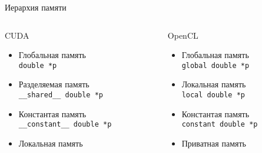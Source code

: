 \documentclass[@BEAMER_OPTIONS@]{beamer}
\newcommand{\code}[1]{\lstinline|#1|}
\begin{document}
\begin{frame}
    \sectionpage
\end{frame}

\begin{frame}[fragile]{Иерархия памяти}
    \begin{columns}
        \begin{column}{0.48\textwidth}
            \begin{block}{CUDA}
                \begin{itemize}
                    \item<2-> Глобальная память\\
                        \code{double *p}
                    \item<3-> Разделяемая память\\
                        \code{__shared__ double *p}
                    \item<4-> Константая память\\
                        \code{__constant__ double *p}
                    \item<5-> Локальная память
                \end{itemize}
            \end{block}
        \end{column}
        \begin{column}{0.48\textwidth}
            \begin{block}{OpenCL}
                \begin{itemize}
                    \item<2-> Глобальная память\\
                        \code{global double *p}
                    \item<3-> Локальная память\\
                        \code{local double *p}
                    \item<4-> Константая память\\
                        \code{constant double *p}
                    \item<5-> Приватная память
                \end{itemize}
            \end{block}
        \end{column}
    \end{columns}
\end{frame}
\end{document}

